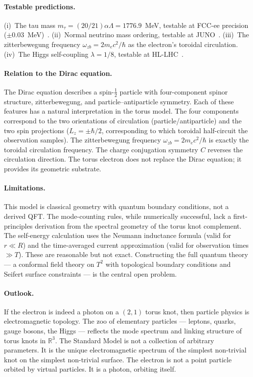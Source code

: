 \documentclass[11pt,a4paper]{article}
\begin{document}
\paragraph{Testable predictions.}
(i)~The tau mass $m_\tau = (20/21)\alpha\Lambda = 1776.9$~MeV, testable at FCC-ee precision ($\pm 0.03$~MeV)~\cite{fcc2019}. (ii)~Normal neutrino mass ordering, testable at JUNO~\cite{juno2016}. (iii)~The zitterbewegung frequency $\omega_{zb} = 2m_e c^2/\hbar$ as the electron's toroidal circulation. (iv)~The Higgs self-coupling $\lambda = 1/8$, testable at HL-LHC~\cite{cepeda2019}.

\paragraph{Relation to the Dirac equation.}
The Dirac equation describes a spin-$\tfrac{1}{2}$ particle with four-component spinor structure, zitterbewegung, and particle--antiparticle symmetry. Each of these features has a natural interpretation in the torus model. The four components correspond to the two orientations of circulation (particle/antiparticle) and the two spin projections ($L_z = \pm\hbar/2$, corresponding to which toroidal half-circuit the observation samples). The zitterbewegung frequency $\omega_{zb} = 2m_e c^2/\hbar$ is exactly the toroidal circulation frequency. The charge conjugation symmetry $C$ reverses the circulation direction. The torus electron does not replace the Dirac equation; it provides its geometric substrate.

\paragraph{Limitations.}
This model is classical geometry with quantum boundary conditions, not a derived QFT. The mode-counting rules, while numerically successful, lack a first-principles derivation from the spectral geometry of the torus knot complement. The self-energy calculation uses the Neumann inductance formula (valid for $r \ll R$) and the time-averaged current approximation (valid for observation times $\gg T$). These are reasonable but not exact. Constructing the full quantum theory --- a conformal field theory on $T^2$ with topological boundary conditions and Seifert surface constraints --- is the central open problem.

\paragraph{Outlook.}
If the electron is indeed a photon on a $(2,1)$ torus knot, then particle physics is electromagnetic topology. The zoo of elementary particles --- leptons, quarks, gauge bosons, the Higgs --- reflects the mode spectrum and linking structure of torus knots in $\mathbb{R}^3$. The Standard Model is not a collection of arbitrary parameters. It is the unique electromagnetic spectrum of the simplest non-trivial knot on the simplest non-trivial surface. The electron is not a point particle orbited by virtual particles. It is a photon, orbiting itself.
\end{document}
